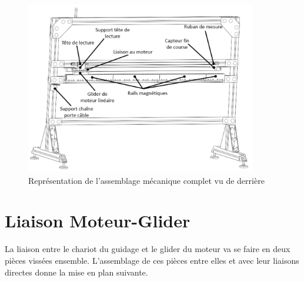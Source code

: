 \begin{figure}[H]
    \centering
    \includegraphics[width = 0.9\textwidth]{assets/figures/AssemblageCompletDerriere.svg}
    \caption{Représentation de l'assemblage mécanique complet vu de derrière}
    \label{fig:AssCompDerriere}
\end{figure}

\section{Liaison Moteur-Glider}\label{sec:LiaisonMotGlid}
La liaison entre le chariot du guidage et le \gls{glider} du moteur va se faire en deux pièces vissées ensemble. L'assemblage de ces pièces
entre elles et avec leur liaisons directes donne la mise en plan suivante.

